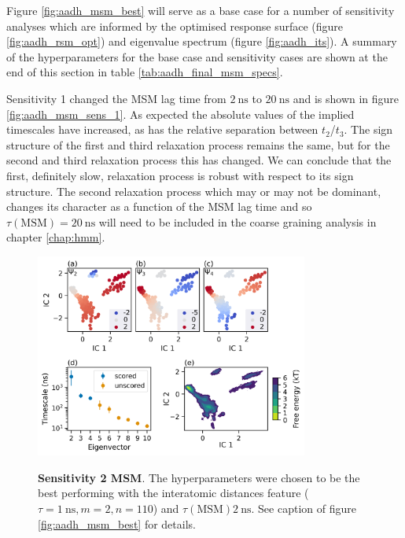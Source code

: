 Figure \ref{fig:aadh_msm_best} will serve as a base case for a number of sensitivity analyses which are informed by the optimised response surface (figure \ref{fig:aadh_rsm_opt}) and eigenvalue spectrum (figure \ref{fig:aadh_its}). A summary of the hyperparameters for the base case and sensitivity cases are shown at the end of this section in table \ref{tab:aadh_final_msm_specs}. 

Sensitivity 1 changed the MSM lag time from $\SI{2}{\nano\second}$ to $\SI{20}{\nano\second}$ and is shown in figure \ref{fig:aadh_msm_sens_1}. As expected the absolute values of the implied timescales have increased, as has the relative separation between $t_{2}$/$t_{3}$. 
The sign structure of the first and third relaxation process remains the same, but for the second and third relaxation process this has changed.  We can conclude that the first, definitely slow, relaxation process is robust with respect to its sign structure. The second relaxation process which may or may not be dominant, changes its character as a function of the MSM lag time and so  $\tau(\mathrm{MSM}) = \SI{20}{\nano\second}$ will need to be included in the coarse graining analysis in chapter \ref{chap:hmm}. 

\begin{figure}
    \centering
    \caption{\textbf{Sensitivity 2 MSM}. The hyperparameters were chosen to be the best performing with the interatomic distances feature ($\tau = \SI{1}{\nano\second}, m=2, n=110$) and $\tau(\mathrm{MSM}) \SI{2}{\nano\second}$. See caption of figure \ref{fig:aadh_msm_best} for details.}
    \includegraphics[width=0.8\textwidth]{chapters/msm_optimization/figures/aadh_msm_sens_2.png}
    \label{fig:aadh_msm_sens_2}
\end{figure}

